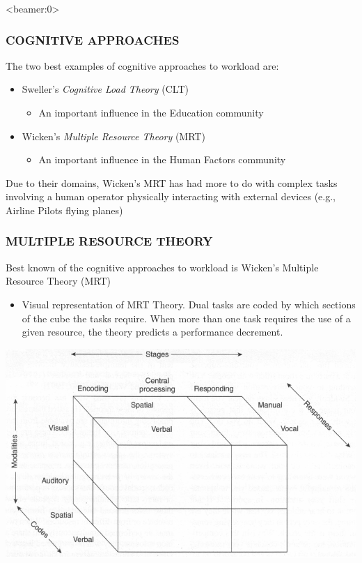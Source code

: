 \documentclass{beamer}
\begin{document}
\begin{frame}<beamer:0>
	\frametitle{COGNITIVE APPROACHES}
	The two best examples of cognitive approaches to workload are:
	\begin{itemize}
		\item Sweller's \emph{Cognitive Load Theory} (CLT) \parencite{chandler96acp,leahy03,leahy11,vanmerri05,sweller88}
		\begin{itemize}
			\item An important influence in the Education community
		\end{itemize}
		\pause
	\listpart{\&}
		\item Wicken's \emph{Multiple Resource Theory} (MRT) \parencite{wickens81,wickens92book,wickens02}
		\begin{itemize}
			\item An important influence in the Human Factors community
		\end{itemize}
	\end{itemize}
\pause
Due to their domains, Wicken's MRT has had more to do with complex tasks involving a human operator physically interacting with external devices (e.g., Airline Pilots flying planes)

\end{frame}

\begin{frame}   %
	\frametitle{MULTIPLE RESOURCE THEORY}
	Best known of the cognitive approaches to workload is Wicken's Multiple Resource Theory (MRT)
	\begin{itemize}
		\item Visual representation of MRT Theory. Dual tasks are coded by which sections of the cube the tasks require. When more than one task requires the use of a given resource, the theory predicts a performance decrement.
	\end{itemize}
	\begin{center}
		\includegraphics[width=.65\textwidth]{../zNvBkFigs/wickens-mrt}
	\end{center}
\end{frame}
\end{document}
